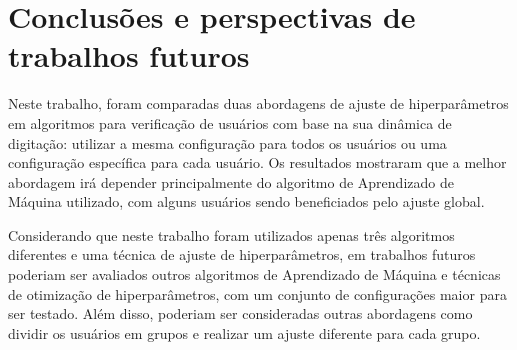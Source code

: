 \section{Conclusões e perspectivas de trabalhos futuros}\label{sec:conclusao}

Neste trabalho, foram comparadas duas abordagens de ajuste de hiperparâmetros em algoritmos para verificação de usuários com base na sua dinâmica de digitação: utilizar a mesma configuração para todos os usuários ou uma configuração específica para cada usuário. Os resultados mostraram que a melhor abordagem irá depender principalmente do algoritmo de Aprendizado de Máquina utilizado, com alguns usuários sendo beneficiados pelo ajuste global.

Considerando que neste trabalho foram utilizados apenas três algoritmos diferentes e uma técnica de ajuste de hiperparâmetros, em trabalhos futuros poderiam ser avaliados outros algoritmos de Aprendizado de Máquina e técnicas de otimização de hiperparâmetros, com um conjunto de configurações maior para ser testado. Além disso, poderiam ser consideradas outras abordagens como dividir os usuários em grupos e realizar um ajuste diferente para cada grupo.